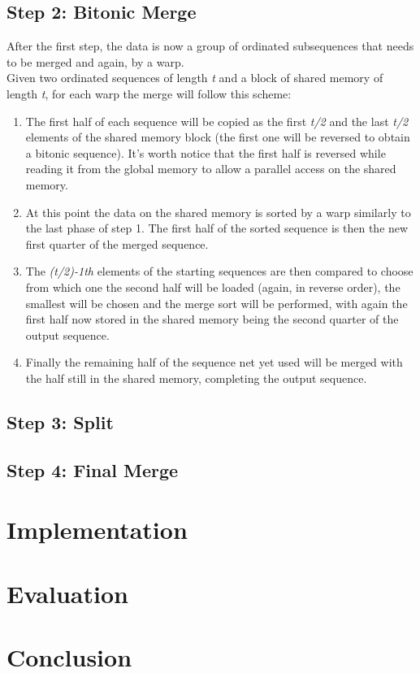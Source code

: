 \documentclass[a4paper, 12pt, oneside]{article}
\begin{document}
\subsection{Step 2: Bitonic Merge}
After the first step, the data is now a group of ordinated subsequences that needs to be merged and again, by a warp.\\
Given two ordinated sequences of length \textit{t} and a block of shared memory of length \textit{t}, for each warp the merge will follow this scheme:
\begin{enumerate}
  \item The first half of each sequence will be copied as the first \textit{t/2} and the last \textit{t/2} elements of the shared memory block (the first one will be reversed to obtain a bitonic sequence). It's worth notice that the first half is reversed while reading it from the global memory to allow a parallel access on the shared memory.
  \item At this point the data on the shared memory is sorted by a warp similarly to the last phase of step 1. The first half of the sorted sequence is then the new first quarter of the merged sequence.
  \item The \textit{(t/2)-1th} elements of the starting sequences are then compared to choose from which one the second half will be loaded (again, in reverse order), the smallest will be chosen and the merge sort will be performed, with again the first half now stored in the shared memory being the second quarter of the output sequence.
  \item Finally the remaining half of the sequence net yet used will be merged with the half still in the shared memory, completing the output sequence.
\end{enumerate}

\subsection{Step 3: Split}

\subsection{Step 4: Final Merge}

\section{Implementation}

\section{Evaluation}

\section{Conclusion}

\printbibliography
\end{document}
